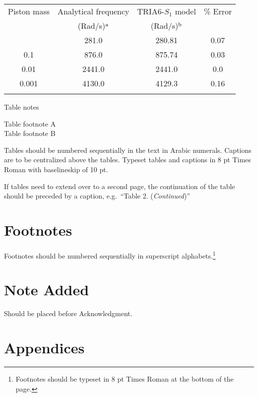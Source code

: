 \documentclass{ws-m3as}
\begin{document}
\begin{table}[ht]
{\begin{tabular}{@{}cccc@{}} \toprule
Piston mass & Analytical frequency & TRIA6-$S_1$ model &
\% Error \\
& (Rad/s)$^{\rm a}$ & (Rad/s)$^{\rm b}$ \\ \colrule
1.0\hphantom{00} & \hphantom{0}281.0 & \hphantom{0}280.81 & 0.07 \\
0.1\hphantom{00} & \hphantom{0}876.0 & \hphantom{0}875.74 & 0.03 \\
0.01\hphantom{0} & 2441.0 & 2441.0\hphantom{0} & 0.0\hphantom{0} \\
0.001 & 4130.0 & 4129.3\hphantom{0} & 0.16\\ \botrule
\end{tabular}}
\begin{tabnote}
Table notes
\end{tabnote}
\begin{tabfootnote}
 Table footnote A\\
 Table footnote B
\end{tabfootnote}
\end{table}

Tables should be numbered sequentially in the text in Arabic
numerals. Captions are to be centralized above the tables.
Typeset tables and captions in 8 pt Times Roman with
baselineskip of 10 pt.

If tables need to extend over to a second page, the continuation
of the table should be preceded by a caption, e.g.~``Table 2.
({\it Continued})''

\section{Footnotes}
Footnotes should be numbered sequentially in superscript
alphabets.\footnote{Footnotes should be typeset in 8 pt
Times Roman at the bottom of the page.}

\section*{Note Added}
Should be placed before Acknowledgment.

\appendix

\section{Appendices}
\end{document}
